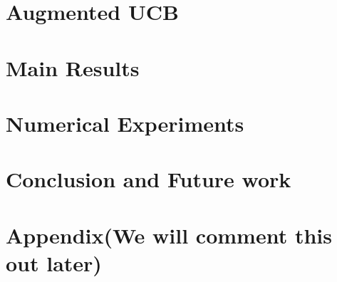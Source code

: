 \documentclass{article}
\begin{document}
%


\section{Augmented UCB}
\label{algorithm}


\section{Main Results}
\label{results}



\section{Numerical Experiments}
\label{expt}



\section{Conclusion and Future work}
\label{conclusion}



\clearpage
\newpage



\clearpage
\newpage
\section{Appendix(We will comment this out later)}
\label{appendix}

\end{document}
